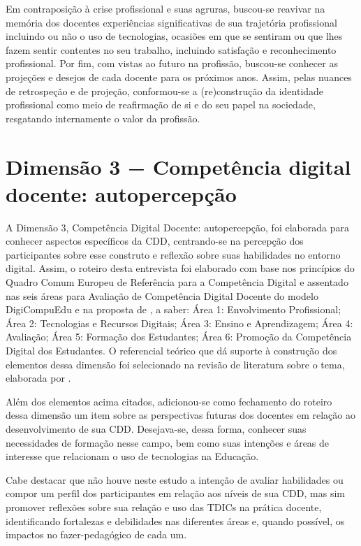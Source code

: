 \documentclass[portuguese]{textolivre}
\begin{document}
Em contraposição à crise profissional e suas agruras, buscou-se reavivar na memória dos docentes experiências significativas de sua trajetória profissional incluindo ou não o uso de tecnologias, ocasiões em que se sentiram ou que lhes fazem sentir contentes no seu trabalho, incluindo satisfação e reconhecimento profissional. Por fim, com vistas ao futuro na profissão, buscou-se conhecer as projeções e desejos de cada docente para os próximos anos. Assim, pelas nuances de retrospeção e de projeção, conformou-se a (re)construção da identidade profissional como meio de reafirmação de si e do seu papel na sociedade, resgatando internamente o valor da profissão.

\section{Dimensão 3 − Competência digital docente: autopercepção}\label{sec-organizacao}
A Dimensão 3, Competência Digital Docente: autopercepção, foi elaborada para conhecer aspectos específicos da CDD, centrando-se na percepção dos participantes sobre esse construto e reflexão sobre suas habilidades no entorno digital. Assim, o roteiro desta entrevista foi elaborado com base nos princípios do Quadro Comum Europeu de Referência para a Competência Digital \cite{punie2013} e assentado nas seis áreas para Avaliação de Competência Digital Docente do modelo DigiCompuEdu \cite{redecker2017} e na proposta de \textcite{trindade2019}, a saber: Área 1: Envolvimento Profissional; Área 2: Tecnologias e Recursos Digitais; Área 3: Ensino e Aprendizagem; Área 4: Avaliação; Área 5: Formação dos Estudantes; Área 6: Promoção da Competência Digital dos Estudantes. O referencial teórico que dá suporte à construção dos elementos dessa dimensão foi selecionado na revisão de literatura sobre o tema, elaborada por \textcite{paz2022}.

Além dos elementos acima citados, adicionou-se como fechamento do roteiro dessa dimensão um item sobre as perspectivas futuras dos docentes em relação ao desenvolvimento de sua CDD. Desejava-se, dessa forma, conhecer suas necessidades de formação nesse campo, bem como suas intenções e áreas de interesse que relacionam o uso de tecnologias na Educação.

Cabe destacar que não houve neste estudo a intenção de avaliar habilidades ou compor um perfil dos participantes em relação aos níveis de sua CDD, mas sim promover reflexões sobre sua relação e uso das TDICs na prática docente, identificando fortalezas e debilidades nas diferentes áreas e, quando possível, os impactos no fazer-pedagógico de cada um.
\end{document}
